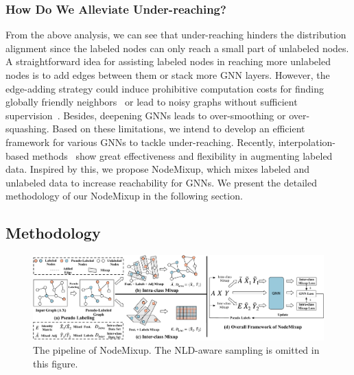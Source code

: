 \documentclass[letterpaper]{article} %
\begin{document}
\subsubsection{How Do We Alleviate Under-reaching?}
From the above analysis, we can see that under-reaching hinders the distribution alignment since the labeled nodes can only reach a small part of unlabeled nodes. A straightforward idea for assisting labeled nodes in reaching more unlabeled nodes is to add edges between them or stack more GNN layers. However, the edge-adding strategy could induce prohibitive computation costs for finding globally friendly neighbors~\cite{rewiring, pastel} or lead to noisy graphs without sufficient supervision~\cite{pastel}. Besides, deepening GNNs leads to over-smoothing or over-squashing. Based on these limitations, we intend to develop an efficient framework for various GNNs to tackle under-reaching. Recently, interpolation-based methods~\cite{mixup, graphmixup,mixup_for_node,graphmix} show great effectiveness and flexibility in augmenting labeled data. Inspired by this, we propose NodeMixup, which mixes labeled and unlabeled data to increase reachability for GNNs. We present the detailed methodology of our NodeMixup in the following section.

\subsection{Methodology}
\label{sec:nodemixup}
 \begin{figure}[!ht]
 	\centering
    \includegraphics[width=1\linewidth]{figs/NodeMixup.pdf}
    \caption{The pipeline of NodeMixup. The NLD-aware sampling is omitted in this figure.}
    \label{fig:nodemixup}
\end{figure}
\end{document}
